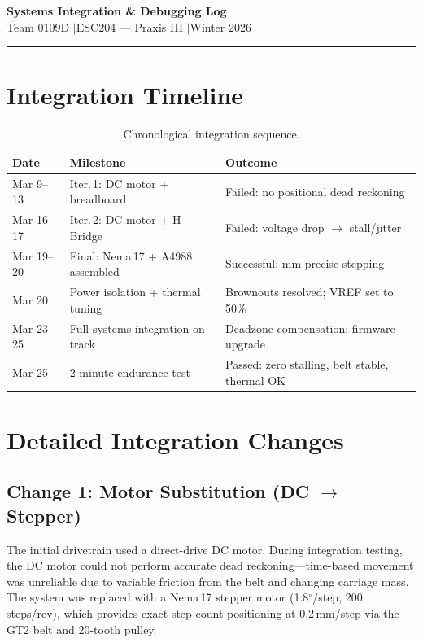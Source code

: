 \documentclass[12pt, letterpaper]{article}
\begin{document}
\begin{center}
{\LARGE\textbf{Systems Integration \& Debugging Log}}\\[2pt]
{\normalsize Team 0109D \quad$\vert$\quad ESC204 --- Praxis III \quad$\vert$\quad Winter 2026}
\end{center}
\noindent\rule{\textwidth}{0.6pt}\vspace{4pt}

\section{Integration Timeline}

\begin{table}[H]
\centering\small
\caption{Chronological integration sequence.}
\begin{tabularx}{\textwidth}{@{}l l X@{}}
\toprule
\textbf{Date} & \textbf{Milestone} & \textbf{Outcome} \\
\midrule
Mar 9--13 & Iter.\,1: DC motor + breadboard & Failed: no positional dead reckoning \\
Mar 16--17 & Iter.\,2: DC motor + H-Bridge & Failed: voltage drop $\rightarrow$ stall/jitter \\
Mar 19--20 & Final: Nema\,17 + A4988 assembled & Successful: mm-precise stepping \\
Mar 20 & Power isolation + thermal tuning & Brownouts resolved; VREF set to 50\% \\
Mar 23--25 & Full systems integration on track & Deadzone compensation; firmware upgrade \\
Mar 25 & 2-minute endurance test & Passed: zero stalling, belt stable, thermal OK \\
\bottomrule
\end{tabularx}
\end{table}

\section{Detailed Integration Changes}

\subsection{Change 1: Motor Substitution (DC $\rightarrow$ Stepper)}

The initial drivetrain used a direct-drive DC motor. During integration testing, the DC motor could not perform accurate dead reckoning---time-based movement was unreliable due to variable friction from the belt and changing carriage mass. The system was replaced with a Nema\,17 stepper motor (1.8$^\circ$/step, 200 steps/rev), which provides exact step-count positioning at 0.2\,mm/step via the GT2 belt and 20-tooth pulley.
\end{document}
